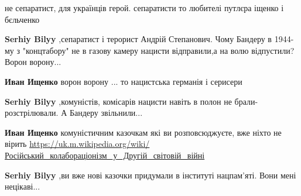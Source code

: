 \begin{itemize}
\begin{itemize}
не сепаратист, для українців герой. сепаратисти то любителі путлєра іщенко і бєльченко

 
\textbf{Serhiy Bilyy} ,сепаратист і терорист Андрій Степанович. Чому Бандеру в
1944-му з "концтабору" не в газову камеру нацисти відправили,а на волю
відпустили? Ворон ворону...

 
\textbf{Иван Ищенко} ворон ворону ... то нацистська германія і серисери

 
\textbf{Serhiy Bilyy} ,комуністів, комісарів нацисти навіть в полон не брали-розстрілювали. А Бандеру звільнили...

 
\textbf{Иван Ищенко} комуністичним казочкам які ви розповсюджуєте, вже ніхто не вірить
\url{https://uk.m.wikipedia.org/wiki/Російський_колабораціонізм_у_Другій_світовій_війні}

 
\textbf{Serhiy Bilyy} ,ви вже нові казочки придумали в інституті нацпам'яті. Вони мені нецікаві...

 

\end{itemize}
\end{itemize}
